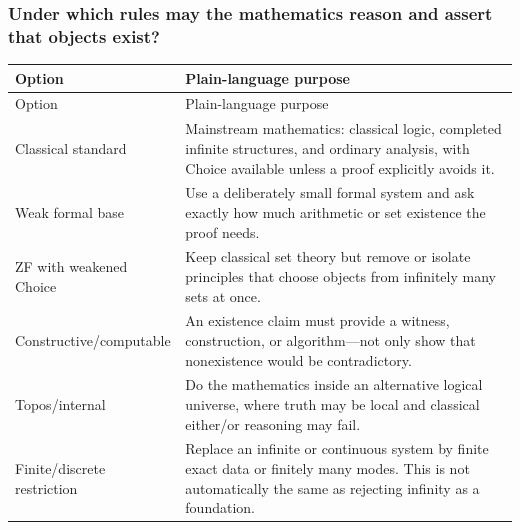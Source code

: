 \subsubsection{Under which rules may the mathematics reason and assert that objects exist?}
\begingroup
\small
\begin{longtable}{@{}p{}p{}@{}}
\toprule
Option & Plain-language purpose \\
\midrule
\endfirsthead
\toprule
Option & Plain-language purpose \\
\midrule
\endhead
Classical standard & Mainstream mathematics: classical logic, completed infinite structures, and ordinary analysis, with Choice available unless a proof explicitly avoids it. \\
Weak formal base & Use a deliberately small formal system and ask exactly how much arithmetic or set existence the proof needs. \\
ZF with weakened Choice & Keep classical set theory but remove or isolate principles that choose objects from infinitely many sets at once. \\
Constructive/computable & An existence claim must provide a witness, construction, or algorithm---not only show that nonexistence would be contradictory. \\
Topos/internal & Do the mathematics inside an alternative logical universe, where truth may be local and classical either/or reasoning may fail. \\
Finite/discrete restriction & Replace an infinite or continuous system by finite exact data or finitely many modes. This is not automatically the same as rejecting infinity as a foundation. \\
\bottomrule
\end{longtable}
\endgroup


